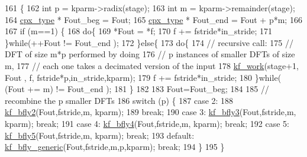 \begin{DoxyCode}
161     \{
162         \textcolor{keywordtype}{int} p = kparm->radix(stage);
163         \textcolor{keywordtype}{int} m = kparm->remainder(stage);
164         \hyperlink{classcudafft_a6b6e4901630f197baf4cf7f165543ece}{cpx\_type} * Fout\_beg = Fout;
165         \hyperlink{classcudafft_a6b6e4901630f197baf4cf7f165543ece}{cpx\_type} * Fout\_end = Fout + p*m;
166 
167         \textcolor{keywordflow}{if} (m==1) \{
168             \textcolor{keywordflow}{do}\{
169                 *Fout = *f;
170                 f += fstride*in\_stride;
171             \}\textcolor{keywordflow}{while}(++Fout != Fout\_end );
172         \}\textcolor{keywordflow}{else}\{
173             \textcolor{keywordflow}{do}\{
174                 \textcolor{comment}{// recursive call:}
175                 \textcolor{comment}{// DFT of size m*p performed by doing}
176                 \textcolor{comment}{// p instances of smaller DFTs of size m, }
177                 \textcolor{comment}{// each one takes a decimated version of the input}
178                 \hyperlink{classcudafft_af9502e8f518c37489d730fc1830998d2}{kf\_work}(stage+1, Fout , f, fstride*p,in\_stride,kparm);
179                 f += fstride*in\_stride;
180             \}\textcolor{keywordflow}{while}( (Fout += m) != Fout\_end );
181         \}
182 
183         Fout=Fout\_beg;
184 
185         \textcolor{comment}{// recombine the p smaller DFTs }
186         \textcolor{keywordflow}{switch} (p) \{
187             \textcolor{keywordflow}{case} 2:  
188                 \hyperlink{classcudafft_a1ea7f9333903a6af29c4c7dfdce5a188}{kf\_bfly2}(Fout,fstride,m, kparm); 
189                 \textcolor{keywordflow}{break};
190            \textcolor{keywordflow}{case} 3: \hyperlink{classcudafft_aaf70d4484be564eecf99bfb47a90e29e}{kf\_bfly3}(Fout,fstride,m, kparm); \textcolor{keywordflow}{break};
191            \textcolor{keywordflow}{case} 4: \hyperlink{classcudafft_a5c532f69602cc530be63b3d9567850e5}{kf\_bfly4}(Fout,fstride,m, kparm); \textcolor{keywordflow}{break};
192            \textcolor{keywordflow}{case} 5: \hyperlink{classcudafft_a40bbcde352f3a3ac8e931fa509880c98}{kf\_bfly5}(Fout,fstride,m, kparm); \textcolor{keywordflow}{break};
193            \textcolor{keywordflow}{default}: \hyperlink{classcudafft_a10bd12be6d50bc12dd45e8d7278f98b9}{kf\_bfly\_generic}(Fout,fstride,m,p,kparm); \textcolor{keywordflow}{break};
194         \}
195     \}
\end{DoxyCode}
